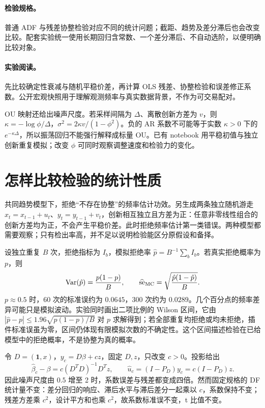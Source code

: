 

\paragraph{检验规格。}普通 ADF 与残差协整检验对应不同的统计问题；截距、趋势及差分滞后也会改变比较。配套实验统一使用长期回归含常数、一个差分滞后、不自动选阶，以便明确比较对象。

\paragraph{实验阅读。}先比较确定性衰减与随机平稳价差，再计算 OLS 残差、协整检验和误差修正系数。公开宏观快照用于理解观测频率与真实数据背景，不作为可交易配对。

OU 映射还给出噪声尺度。若采样间隔为 $\Delta$、离散创新方差为 $v$，则 $\kappa=-\log\phi/\Delta$，$\sigma^2=2\kappa v/(1-\phi^2)$。负的 AR 系数不可能等于实数 $\kappa>0$ 下的 $e^{-\kappa\Delta}$，所以振荡回归不能强行解释成标量 OU。已有 notebook 用平稳初值与独立创新重复模拟；改变 $\phi$ 可同时观察调整速度和检验力的变化。

\section{怎样比较检验的统计性质}

共同趋势模型下，拒绝“不存在协整”的频率估计功效。另生成两条独立随机游走 $x_t=x_{t-1}+u_t$、$y_t=y_{t-1}+v_t$，创新相互独立且方差为正：任意非零线性组合的创新方差均为正，不会产生平稳价差。此时拒绝频率估计第一类错误。两种模型都需要观察；只有检出率高，并不足以说明检验能区分原假设和备择。

设独立重复 $B$ 次，拒绝指标为 $I_b$，模拟拒绝率 $\hat p=B^{-1}\sum_b I_b$。若真实拒绝概率为 $p$，则
\[
 \operatorname{Var}(\hat p)=\frac{p(1-p)}B,\qquad
 \widehat{\operatorname{se}}_{\rm MC}=\sqrt{\frac{\hat p(1-\hat p)}B}.
\]
$p\approx0.5$ 时，60 次的标准误约为 $0.0645$，300 次约为 $0.0289$。几个百分点的频率差异可能只是模拟波动。实验同时画出二项比例的 Wilson 区间，它由 $|\hat p-p|\le1.96\sqrt{p(1-p)/B}$ 对 $p$ 求解得到；若全部重复均拒绝或均未拒绝，插件标准误虽为零，区间仍体现有限模拟次数的不确定性。这个区间描述检验在已给模型中的拒绝概率，不是协整为真的概率。

令 $D=(\mathbf1,x)$，$y_c=D\beta+cz$，固定 $D,z$，只改变 $c>0$。投影给出
\[
 \hat\beta_c-\beta=c(D^TD)^{-1}D^Tz,\qquad
 \hat u_c=(I-P_D)y_c=c(I-P_D)z.
\]
因此噪声尺度由 $0.5$ 增至 2 时，系数误差与残差都变成四倍。然而固定规格的 DF 统计量不变：差分回归的响应、滞后水平与滞后差分一起乘以 $c$，系数保持不变；残差方差乘 $c^2$，设计平方和也乘 $c^2$，故系数标准误不变，t 比值不变。


